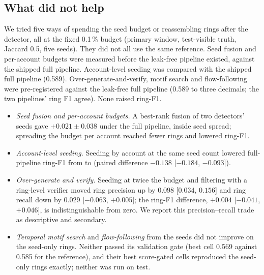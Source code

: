 \subsection{What did not help}
\label{sec:results-negative}
We tried five ways of spending the seed budget or reassembling rings after the detector, all at
the fixed 0.1\,\% budget (primary window, test-visible truth, Jaccard 0.5, five seeds). They did not
all use the same reference. Seed fusion and per-account budgets were measured before the leak-free
pipeline existed, against the shipped full pipeline. Account-level seeding was compared with the
shipped full pipeline (0.589). Over-generate-and-verify, motif search and flow-following were
pre-registered against the leak-free full pipeline (0.589 to three decimals; the two pipelines'
ring F1 agree). None raised ring-F1.
\begin{itemize}
\item \emph{Seed fusion and per-account budgets.} A best-rank fusion of two detectors' seeds
gave $+0.021 \pm 0.038$ under the full pipeline, inside seed spread; spreading the budget per
account reached fewer rings and lowered ring-F1.
\item \emph{Account-level seeding.} Seeding by account at the same seed count lowered full-pipeline
ring-F1 from  to  (paired difference $-0.138$
[$-0.184$, $-0.093$]).
\item \emph{Over-generate and verify.} Seeding at twice the budget and filtering with a ring-level
verifier moved ring precision up by $0.098$ [$0.034$, $0.156$] and ring recall down by $0.029$
[$-0.063$, $+0.005$]; the ring-F1 difference, $+0.004$ [$-0.041$, $+0.046$], is
indistinguishable from zero. We report this precision--recall trade as descriptive and secondary.
\item \emph{Temporal motif search} and \emph{flow-following} from the seeds did not improve on the
seed-only rings. Neither passed its validation gate (best cell 0.569 against 0.585 for the
reference), and their best score-gated cells reproduced the seed-only rings exactly; neither was
run on test.
\end{itemize}
